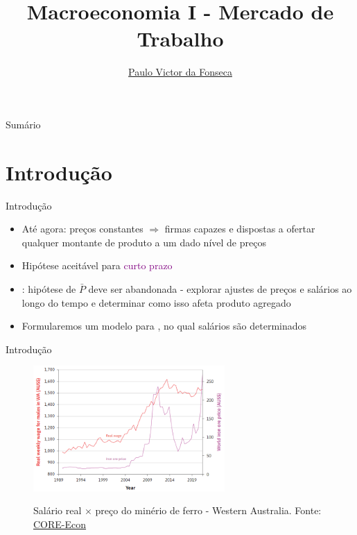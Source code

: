 \documentclass[10pt]{beamer}
\title[]{Macroeconomia I - Mercado de Trabalho}
\author[]{\href{https://pvfonseca.github.io}{Paulo Victor da Fonseca}}
\date{}
\begin{document}
\begin{frame}[plain]
\end{frame}

\begin{frame}{Sumário}
    \tableofcontents
\end{frame}

\section{Introdução}
\begin{frame}
    {Introdução}
    \begin{itemize}
        \item Até agora: preços constantes $\Rightarrow$ firmas capazes e dispostas a ofertar qualquer montante de produto a um dado nível de preços\bigskip
        \item Hipótese aceitável para \textcolor{purple}{curto prazo}\bigskip
        \item {}: hipótese de $\bar{P}$ deve ser abandonada - explorar ajustes de preços e salários ao longo do tempo e determinar como isso afeta produto agregado\bigskip
        \item Formularemos um modelo para , no qual salários são determinados
    \end{itemize}
\end{frame}

\begin{frame}
    {Introdução}
    \begin{figure}
        \centering
        \href{https://www.core-econ.org/the-economy/book/text/09.html}{\includegraphics[width=0.65\textwidth]{./figures/aula10_fig1.PNG}}
        \caption{Salário real $\times$ preço do minério de ferro - Western Australia. Fonte: \href{https://www.core-econ.org/the-economy/book/text/09.html}{CORE-Econ}}
    \end{figure}
\end{frame}
\end{document}
